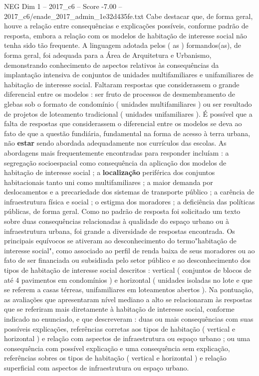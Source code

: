\begin{textsample}{NEG Dim 1 – 2017\_c6 – Score -7.00 – 2017\_c6/enade\_2017\_admin\_1e32d435fe.txt}
Cabe destacar que, de forma geral, houve a relação entre consequências e explicações possíveis, conforme padrão de resposta, embora a relação com os modelos de habitação de interesse social não tenha sido tão frequente.
A linguagem adotada pelos ( as ) formandos(as), de forma geral, foi adequada para a Área de Arquitetura e Urbanismo, demonstrando conhecimento de aspectos relativos às consequências da implantação intensiva de conjuntos de unidades multifamiliares e unifamiliares de habitação de interesse social.
Faltaram respostas que considerassem o grande diferencial entre os modelos : ser fruto de processos de desmembramento de glebas sob o formato de condomínio ( unidades multifamiliares ) ou ser resultado de projetos de loteamento tradicional ( unidades unifamiliares ).
É possível que a falta de respostas que considerassem o diferencial entre os modelos se deva ao fato de que a questão fundiária, fundamental na forma de acesso à terra urbana, não \textbf{estar} sendo abordada adequadamente nos currículos das escolas.
As abordagens mais frequentemente encontradas para responder incluíam : a segregação socioespacial como consequência da aplicação dos modelos de habitação de interesse social ; a \textbf{localização} periférica dos conjuntos habitacionais tanto uni como multifamiliares ; a maior demanda por deslocamentos e a precariedade dos sistemas de transporte público ; a carência de infraestrutura física e social ; o estigma dos moradores ; a deficiência das políticas públicas, de forma geral.
Como no padrão de resposta foi solicitado um texto sobre duas consequências relacionadas à qualidade do espaço urbano ou à infraestrutura urbana, foi grande a diversidade de respostas encontrada.
Os principais equívocos se ativeram ao desconhecimento do termo"habitação de interesse social", como associado ao perfil de renda baixa de seus moradores ou ao fato de ser financiada ou subsidiada pelo setor público e ao desconhecimento dos tipos de habitação de interesse social descritos : vertical ( conjuntos de blocos de até 4 pavimentos em condomínios ) e horizontal ( unidades isoladas no lote e que se referem a casas térreas, unifamiliares em loteamentos abertos ).
Na pontuação, as avaliações que apresentaram nível mediano a alto se relacionaram às respostas que se referiram mais diretamente à habitação de interesse social, conforme indicado no enunciado, e que descreveram : duas ou mais consequências com suas possíveis explicações, referências corretas aos tipos de habitação ( vertical e horizontal ) e relação com aspectos de infraestrutura ou espaço urbano ; ou uma consequência com possível explicação e uma consequência sem explicação, referências sobres os tipos de habitação ( vertical e horizontal ) e relação superficial com aspectos de infraestrutura ou espaço urbano.

\end{textsample}
